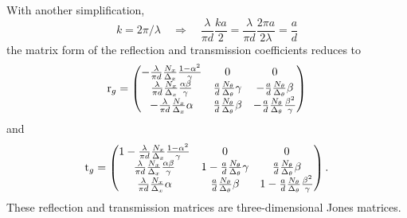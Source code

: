 With another simplification,
\begin{equation}
    k = 2\pi / \lambda
    \quad \Rightarrow \quad
    \frac{\lambda}{\pi d} \frac{ka}{2}
    =
    \frac{\lambda}{\pi d} \frac{2\pi a}{2\lambda}
    =
    \frac{a}{d}
\end{equation}
the matrix form of the reflection and transmission coefficients reduces to
\begin{equation}
    \mathrm{r}_g =
    \begin{pmatrix}
        -\frac{\lambda}{\pi d}
        \frac{N_x}{\Delta_x}
        \frac{1 - \alpha^2}{\gamma}
        &
        0
        &
        0
        \\
        \frac{\lambda}{\pi d}
        \frac{N_x}{\Delta_x}
        \frac{\alpha \beta}{\gamma}
        &
        \frac{a}{d}
        \frac{N_\theta}{\Delta_\theta}
        \gamma
        &
        -
        \frac{a}{d}
        \frac{N_\theta}{\Delta_\theta}
        \beta
        \\
        -
        \frac{\lambda}{\pi d}
        \frac{N_x}{\Delta_x}
        \alpha
        &
        \frac{a}{d}
        \frac{N_\theta}{\Delta_\theta}
        \beta
        &
        -
        \frac{a}{d}
        \frac{N_\theta}{\Delta_\theta}
        \frac{\beta^2}{\gamma}
    \end{pmatrix}
    \label{eq:grid_rg}
\end{equation}
and
\begin{equation}
    \mathrm{t}_g =
    \begin{pmatrix}
        1 -
        \frac{\lambda}{\pi d}
        \frac{N_x}{\Delta_x}
        \frac{1 - \alpha^2}{\gamma}
        &
        0
        &
        0
        \\
        \frac{\lambda}{\pi d}
        \frac{N_x}{\Delta_x}
        \frac{\alpha \beta}{\gamma}
        &
        1 -
        \frac{a}{d}
        \frac{N_\theta}{\Delta_\theta}
        \gamma
        &
        \frac{a}{d}
        \frac{N_\theta}{\Delta_\theta}
        \beta
        \\
        \frac{\lambda}{\pi d}
        \frac{N_x}{\Delta_x}
        \alpha
        &
        \frac{a}{d}
        \frac{N_\theta}{\Delta_\theta}
        \beta
        &
        1 -
        \frac{a}{d}
        \frac{N_\theta}{\Delta_\theta}
        \frac{\beta^2}{\gamma}
    \end{pmatrix}
    \text{.}
    \label{eq:grid_tg}
\end{equation}
These reflection and transmission matrices are three-dimensional Jones matrices.

